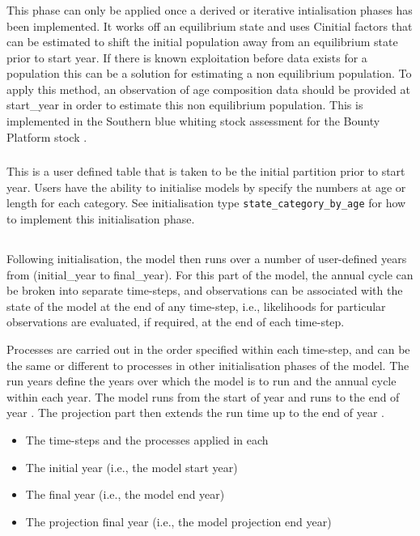 \subsubsection*{}
This phase can only be applied once a derived or iterative intialisation phases has been implemented. It works off an equilibrium state and uses Cinitial factors that can be estimated to shift the initial population away from an equilibrium state prior to start year. If there is known exploitation before data exists for a population this can be a solution for estimating a non equilibrium population. To apply this method, an observation of age composition data should be provided at start\_year in order to estimate this non equilibrium population. This is implemented in the Southern blue whiting stock assessment for the Bounty Platform stock \cite{dunn2011southern}.


\subsubsection*{}
This is a user defined table that is taken to be the initial partition prior to start year. Users have the ability to initialise models by specify the numbers at age or length for each category. See initialisation type \texttt{state\_category\_by\_age} for how to implement this initialisation phase.

\subsection{}
Following initialisation, the model then runs over a number of user-defined years from (initial\_year to final\_year). For this part of the model, the annual cycle can be broken into separate time-steps, and observations can be associated with the state of the model at the end of any time-step, i.e., likelihoods for particular observations are evaluated, if required, at the end of each time-step. 

Processes are carried out in the order specified within each time-step, and can be the same or different to processes in other initialisation phases of the model. The run years define the years over which the model is to run and the annual cycle within each year. The model runs from the start of year  and runs to the end of year . The projection part then extends the run time up to the end of year . 
\begin{itemize}
  \item The time-steps and the processes applied in each
  \item The initial year (i.e., the model start year)
  \item The final year (i.e., the model end year)
  \item The projection final year (i.e., the model projection end year)
\end{itemize}


